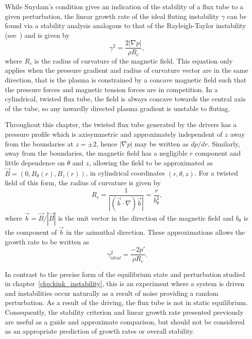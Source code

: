 While Suydam's condition gives an indication of the stability of a flux tube to a given perturbation, the linear growth rate of the ideal fluting instability $\gamma$ can be found via a stability analysis analogous to that of the Rayleigh-Taylor instability (see~\cite{goldstonIntroductionPlasmaPhysics2020}) and is given by
\begin{equation}
  \label{eq:fluting_growth_rate}
\gamma^2 = \frac{2|\nabla p|}{\rho R_c},
\end{equation}
where $R_c$ is the radius of curvature of the magnetic field. This equation only applies when the pressure gradient and radius of curvature vector are in the same direction, that is the plasma is constrained by a concave magnetic field such that the pressure forces and magnetic tension forces are in competition. In a cylindrical, twisted flux tube, the field is always concave towards the central axis of the tube, so any inwardly directed plasma gradient is unstable to fluting.

Throughout this chapter, the twisted flux tube generated by the drivers has a pressure profile which is axisymmetric and approximately independent of $z$ away from the boundaries at $z=\pm2$, hence $|\nabla p|$ may be written as $d p/ dr$. Similarly, away from the boundaries, the magnetic field has a negligible $r$ component and little dependence on $\theta$ and $z$, allowing the field to be approximated as $\vec{B} = (0, B_{\theta}(r), B_z(r))$, in cylindrical coordinates $(r, \theta, z)$. For a twisted field of this form, the radius of curvature is given by 
\begin{equation}
  \label{eq:radius_of_curvature}
  R_c = \frac{1}{|(\vec{b}\cdot\nabla) \vec{b}|} = \frac{r}{b_{\theta}^2},
\end{equation}
where $\vec{b} = \vec{B}/|\vec{B}|$ is the unit vector in the direction of the magnetic field and $b_{\theta}$ is the component of $\vec{b}$ in the azimuthal direction. These approximations allows the growth rate to be written as
\begin{equation}
  \label{eq:fluting_growth_rate2}
\gamma_{ideal}^2 = \frac{-2p'}{\rho R_c}.
\end{equation}

In contrast to the precise form of the equilibrium state and perturbation studied in chapter~\ref{chp:kink_instability}, this is an experiment where a system is driven and instabilities occur naturally as a result of noise providing a random perturbation. As a result of the driving, the flux tube is not in static equilibrium. Consequently, the stability criterion and linear growth rate presented previously are useful as a guide and approximate comparison, but should not be considered as an appropriate prediction of growth rates or overall stability.

